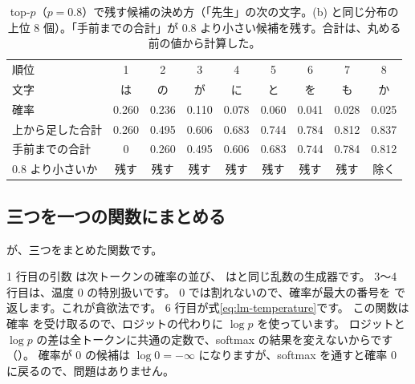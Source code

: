 \begin{table}[htbp]
\centering
\caption{top-$p$（$p=0.8$）で残す候補の決め方（「先生」の次の文字。(b) と同じ分布の上位 8 個）。「手前までの合計」が 0.8 より小さい候補を残す。合計は、丸める前の値から計算した。}
\label{tab:lm-topp}
\small
\setlength{\tabcolsep}{4.5pt}
\begin{tabular}{lcccccccc}
\toprule
順位 & 1 & 2 & 3 & 4 & 5 & 6 & 7 & 8 \\
文字 & は & の & が & に & と & を & も & か \\
\midrule
確率 & 0.260 & 0.236 & 0.110 & 0.078 & 0.060 & 0.041 & 0.028 & 0.025 \\
上から足した合計 & 0.260 & 0.495 & 0.606 & 0.683 & 0.744 & 0.784 & 0.812 & 0.837 \\
手前までの合計 & 0 & 0.260 & 0.495 & 0.606 & 0.683 & 0.744 & 0.784 & 0.812 \\
0.8 より小さいか & 残す & 残す & 残す & 残す & 残す & 残す & 残す & 除く \\
\bottomrule
\end{tabular}
\end{table}

\subsection*{三つを一つの関数にまとめる}

が、三つをまとめた関数です。

\par{} %

1 行目の引数  は次トークンの確率の並び、 はと同じ乱数の生成器です。
3〜4 行目は、温度 0 の特別扱いです。
0 では割れないので、確率が最大の番号を  で返します。これが貪欲法です。
6 行目が式\eqref{eq:lm-temperature}です。
この関数は確率  を受け取るので、ロジットの代わりに $\log p$ を使っています。
ロジットと $\log p$ の差は全トークンに共通の定数で、softmax の結果を変えないからです（）。
確率が 0 の候補は $\log 0=-\infty$ になりますが、softmax を通すと確率 0 に戻るので、問題はありません。

